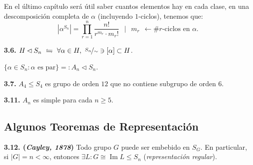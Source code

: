 \begin{note}
    En el último capítulo será útil saber cuantos elementos hay en cada clase, en una descomposición completa de \(\alpha\) (incluyendo \(1\)-ciclos), tenemos que: 
    \[|\alpha^{S_n}| = \prod_{r=1}^n \frac{n!}{r^{m_r} \cdot m_r !} \ \ \mid \ \  m_r\ \  \leftarrow  \#r\text{-ciclos en }\alpha.\] 
\end{note}

\begin{corollary}
    \textbf{3.6.} \(H \lhd S_n \ \leftrightharpoons \ \forall \alpha \in H, \ \nicefrac{S_n}{\sim} \ni [\alpha] \subset H\). 
\end{corollary}

\begin{definition}
    \centering \(\{\alpha\in S_n: \alpha \text{ es par}\} =: A_n \lhd S_n \).   
\end{definition}
    
\begin{theorem}
    \textbf{3.7.} \(A_4 \leq S_4\) es grupo de orden \(12\) que no contiene subgrupo de orden \(6\).  
\end{theorem}


\begin{theorem}
    \textbf{3.11.} \(A_n \) es simple para cada \(n\geq 5\). 
\end{theorem}

\subsection*{Algunos Teoremas de Representación}

\begin{theorem}
    \textbf{3.12. (\emph{Cayley, 1878})} Todo grupo \(G\) puede ser embebido en \(S_G\). En particular, si \(|G|= n < \infty \), entonces \(\exists L: G \cong \operatorname{Im}L \leq S_n\) (\emph{representación regular}).   
\end{theorem}

